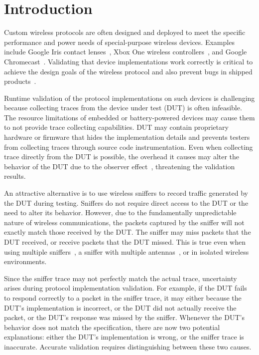 
\section{Introduction}
\label{sec:intro}

Custom wireless protocols are often designed and deployed to meet the specific
performance and power needs of special-purpose wireless devices. Examples
include Google
Iris contact lenses~\cite{iris}, Xbox One wireless controllers~\cite{xbox}, and
Google Chromecast~\cite{chromecast}. Validating that device implementations work
correctly is critical to achieve the design goals of the wireless protocol and
also prevent bugs in shipped products~\cite{wifried,lollipop,surface}.


Runtime validation of the protocol implementations on such devices is
challenging because collecting traces from the device under test (DUT) is often
infeasible. The resource limitations of embedded or battery-powered devices may
cause them to not provide trace collecting capabilities. DUT may contain
proprietary hardware or firmware that hides the implementation details and
prevents testers from collecting traces through source code instrumentation.
Even when collecting trace directly from the DUT is possible, the overhead it causes
may alter the behavior of the DUT due to the observer
effect~\cite{mytkowicz2008observer}, threatening the validation results.

An attractive alternative is to use wireless
sniffers to record traffic generated by the DUT during testing.
Sniffers do not require direct access to the DUT or the need to alter its behavior.
However, due to the fundamentally unpredictable nature of wireless
communications, the packets captured by the sniffer will not exactly match
those received by the DUT.
The sniffer may miss packets that the DUT received, or receive packets that
the DUT missed.
This is true even when using multiple
sniffers~\cite{cheng2006jigsaw,mahajan2006analyzing,bahl2006enhancing}, a sniffer
with multiple antennas~\cite{omnipeek}, or in isolated wireless environments.

Since the sniffer trace may not perfectly match the actual trace, uncertainty
arises during protocol implementation validation.  For example, if the DUT fails
to respond correctly to a packet in the sniffer trace, it may either because the
DUT's implementation is incorrect, or the DUT did not actually receive the
packet, or the DUT's response was missed by the sniffer.  Whenever the DUT's
behavior does not match the specification, there are now two potential
explanations: either the DUT's implementation is wrong, or the sniffer trace is
inaccurate. Accurate validation requires  distinguishing between these two
causes.

